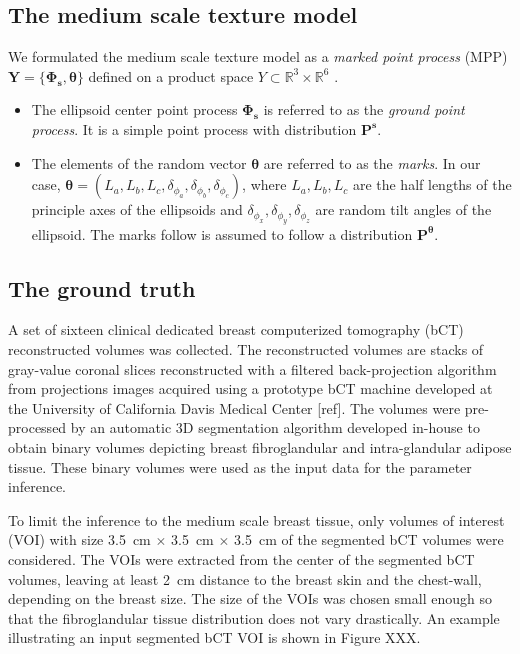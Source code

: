 \documentclass[journal]{IEEEtran}
\begin{document}
\subsection{The medium scale texture model}
\label{chap4-sec1-sub1:math-form-medi}

We formulated the medium scale texture model as a \textit{marked point
  process} (MPP)
$\mathbf{Y} = \{ \mathbf{\Phi_{s}},\boldsymbol{\theta} \}$ defined on
a product space $Y \subset \mathbb{R}^{3} \times \mathbb{R}^6$
\cite{chiu2013stochastic}.

\begin{itemize}

\item The ellipsoid center point process $\mathbf{\Phi_s}$ is referred
  to as the \textit{ground point process}. It is a simple point
  process with distribution $\mathbf{P}^{\mathbf{s}}$.

\item The elements of the random vector $\boldsymbol{\theta}$ are
  referred to as the \textit{marks}. In our case,
  $\boldsymbol{\theta} = \left( L_a, L_b, L_c, \delta_{\phi_a},
    \delta_{\phi_b}, \delta_{\phi_c} \right)$, where $L_a, L_b, L_c$
  are the half lengths of the principle axes of the ellipsoids and
  $\delta_{\phi_{x}},\delta_{\phi_{y}},\delta_{\phi_{z}}$ are random
  tilt angles of the ellipsoid. The marks follow is assumed to follow
  a distribution $\mathbf{P}^{\boldsymbol{\theta}}$.
\end{itemize}

\subsection{The ground truth}
\label{chap4-sec1-sub2:ground-truth}

A set of sixteen clinical dedicated breast computerized tomography
(bCT) reconstructed volumes was collected. The reconstructed volumes
are stacks of gray-value coronal slices reconstructed with a filtered
back-projection algorithm from projections images acquired using a
prototype bCT machine developed at the University of California Davis
Medical Center [ref]. The volumes were pre-processed by an automatic
3D segmentation algorithm developed in-house to obtain binary volumes
depicting breast fibroglandular and intra-glandular adipose
tissue. These binary volumes were used as the input data for the
parameter inference.

To limit the inference to the medium scale breast tissue, only volumes
of interest (VOI) with size \SI{3.5}{\cm} $\times$ \SI{3.5}{\cm}
$\times$ \SI{3.5}{\cm} of the segmented bCT volumes were
considered. The VOIs were extracted from the center of the segmented
bCT volumes, leaving at least \SI{2}{\cm} distance to the breast skin
and the chest-wall, depending on the breast size. The size of the VOIs
was chosen small enough so that the fibroglandular tissue distribution
does not vary drastically. An example illustrating an input segmented
bCT VOI is shown in Figure XXX.
\end{document}
